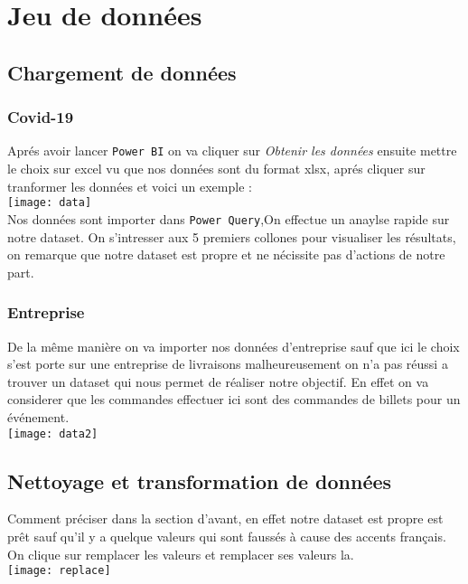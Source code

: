 \documentclass[french,a4paper,11pt,oneside]{book}
\begin{document}
	\section{Jeu de données}{
		
		\subsection{Chargement de données}{
			\subsubsection{Covid-19}{
				Aprés avoir lancer \texttt{Power BI} on va cliquer sur {\itshape Obtenir les données} ensuite mettre le choix sur excel vu que nos données sont du format xlsx, aprés cliquer sur tranformer les données et voici un exemple :\\
				\texttt{[image: data]}
				\\
				Nos données sont importer dans \texttt{Power Query},On effectue un anaylse rapide sur notre dataset.
				On s'intresser aux 5 premiers collones pour visualiser les résultats, on remarque que notre dataset est propre et ne nécissite pas d'actions de notre part.\\
				
			}
			\subsubsection{Entreprise}{
				De la même manière on va importer nos données d'entreprise sauf que ici le choix s'est porte sur une entreprise de livraisons malheureusement on n'a pas réussi a trouver un dataset qui nous permet de réaliser notre objectif.
				En effet on va considerer que les commandes effectuer ici sont des commandes de billets pour un événement.\\
				\texttt{[image: data2]}
			}
		
		}
		\subsection{Nettoyage et transformation de données}{
 			Comment préciser dans la section d'avant, en effet notre dataset est propre est prêt sauf qu'il y a quelque valeurs qui sont faussés à cause des accents français.\\
 			On clique sur remplacer les valeurs et remplacer ses valeurs la.\\
 			\texttt{[image: replace]}
 			
}}
\end{document}
